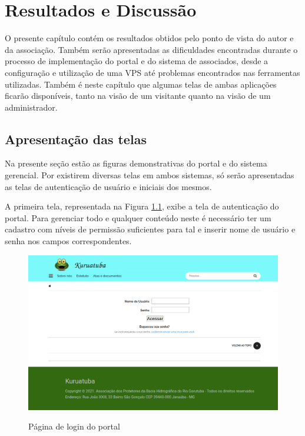 \chapter{Resultados e Discussão}

O presente capítulo contém os resultados obtidos pelo ponto de vista do autor e da associação. Também serão apresentadas as dificuldades encontradas durante o processo de implementação do portal e do sistema de associados, desde a configuração e utilização de uma VPS até problemas encontrados nas ferramentas utilizadas. Também é neste capítulo que algumas telas de ambas aplicações ficarão disponíveis, tanto na visão de um visitante quanto na visão de um administrador.

\hspace{2.5cm}
\section{Apresentação das telas}
\label{subsec:telas}
\hspace{2.5cm}

Na presente seção estão as figuras demonstrativas do portal e do sistema gerencial. Por existirem diversas telas em ambos sistemas, só serão apresentadas as telas de autenticação de usuário e iniciais dos mesmos.

A primeira tela, representada na Figura \ref{fig:login-portal}, exibe a tela de autenticação do portal. Para gerenciar todo e qualquer conteúdo neste é necessário ter um cadastro com níveis de permissão suficientes para tal e inserir nome de usuário e senha nos campos correspondentes.

\begin{figure}[htb]
 \centering
 \caption{Página de login do portal}
 \includegraphics[width=1\textwidth]{figuras/kuruatuba_portal_login.png}
 \label{fig:login-portal}
\end{figure}


